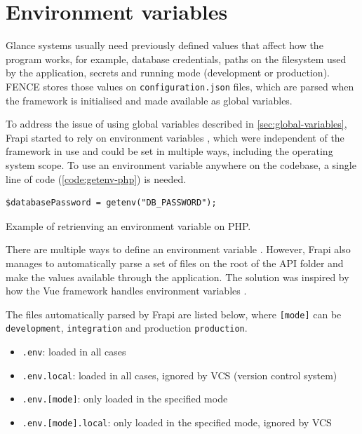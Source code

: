 \section{Environment variables}

Glance systems usually need previously defined values that affect how the program works, for example, database credentials, paths on the filesystem used by the application, secrets and running mode (development or production). FENCE stores those values on \texttt{configuration.json} files, which are parsed when the framework is initialised and made available as global variables.

To address the issue of using global variables described in \autoref{sec:global-variables}, Frapi started to rely on environment variables \cite{frapi-environment-variables}, which were independent of the framework in use and could be set in multiple ways, including the operating system scope. To use an environment variable anywhere on the codebase, a single line of code (\autoref{code:getenv-php}) is needed.

\begin{listing}[htbp]
\begin{verbatim}
$databasePassword = getenv("DB_PASSWORD");
\end{verbatim}
\caption{Example of retrienving an environment variable on PHP.}
\label{code:getenv-php}
\end{listing}

There are multiple ways to define an environment variable \cite{defining-environment-variables}. However, Frapi also manages to automatically parse a set of files on the root of the API folder and make the values available through the application. The solution was inspired by how the Vue framework \cite{vue-about} handles environment variables \cite{vue-environment-variables}.

The files automatically parsed by Frapi are listed below, where \texttt{[mode]} can be \texttt{development}, \texttt{integration} and production \texttt{production}.

\begin{itemize}
    \item \texttt{.env}: loaded in all cases
    \item \texttt{.env.local}: loaded in all cases, ignored by VCS (version control system)
    \item \texttt{.env.[mode]}: only loaded in the specified mode
    \item \texttt{.env.[mode].local}: only loaded in the specified mode, ignored by VCS
\end{itemize}

